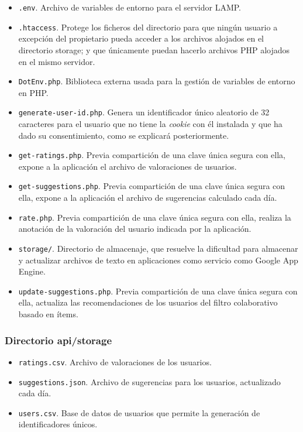 \begin{itemize}
	\item \texttt{.env}. Archivo de variables de entorno para el servidor LAMP.
	\item \texttt{.htaccess}. Protege los ficheros del directorio para que ningún usuario a excepción del propietario pueda acceder a los archivos alojados en el directorio \guillemotleft storage\guillemotright\space; y que únicamente puedan hacerlo archivos PHP alojados en el mismo servidor.
	\item \texttt{DotEnv.php}. Biblioteca externa usada para la gestión de variables de entorno en PHP.
	\item \texttt{generate-user-id.php}. Genera un identificador único aleatorio de 32 caracteres para el usuario que no tiene la \textit{cookie} con él instalada y que ha dado su consentimiento, como se explicará posteriormente. 
	\item \texttt{get-ratings.php}. Previa compartición de una clave única segura con ella, expone a la aplicación el archivo de valoraciones de usuarios.
	\item \texttt{get-suggestions.php}. Previa compartición de una clave única segura con ella, expone a la aplicación el archivo de sugerencias calculado cada día.
	\item \texttt{rate.php}. Previa compartición de una clave única segura con ella, realiza la anotación de la valoración del usuario indicada por la aplicación.
	\item \texttt{storage/}. Directorio de almacenaje, que resuelve la dificultad para almacenar y actualizar archivos de texto en aplicaciones como servicio como Google App Engine.
	\item \texttt{update-suggestions.php}. Previa compartición de una clave única segura con ella, actualiza las recomendaciones de los usuarios del filtro colaborativo basado en ítems. 

\end{itemize}

\subsubsection{Directorio \guillemotleft api/storage\guillemotright\space}

\begin{itemize}
	\item \texttt{ratings.csv}. Archivo de valoraciones de los usuarios.
	\item \texttt{suggestions.json}. Archivo de sugerencias para los usuarios, actualizado cada día.
	\item \texttt{users.csv}. Base de datos de usuarios que permite la generación de identificadores únicos.

\end{itemize}

